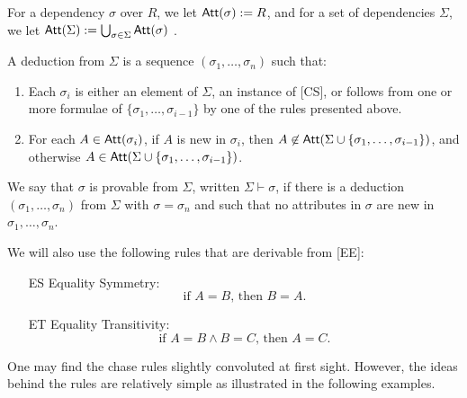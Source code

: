 \documentclass[envcountset]{llncs}
\newcommand{\problemFont}[1]{\protect\ensuremath{\mathsf{#1}}}
\newcommand{\si}{\sigma}
\newcommand{\Si}{\Sigma}
\newcommand{\ja}{\wedge}
\newcommand{\at}{\problemFont{Att}}
\begin{document}
For a dependency $\si$ over $R$, we let $\at(\si):=R$, and for a set of dependencies $\Si$, we let $\at(\Si):=\bigcup_{\si\in\Si}\at(\si)$ .

\begin{definition}\label{dedu}
A deduction from $\Si$ is a sequence $(\si_1, \ldots ,\si_n)$ such that:
\begin{enumerate}
\item Each $\si_i$ is either an element of $\Si$, an instance of [CS], or follows from one or more formulae of $\{\sigma_1, \ldots ,\sigma_{i-1}\}$ by one of the rules presented above.
\item For each $A\in \at(\si_i)$, if $A$ is new in $\si_i$, then $A\not\in \at(\Si\cup\{\sigma_1,\ldots ,\sigma_{i-1}\})$, and otherwise $A\in \at(\Si\cup\{\sigma_1,\ldots ,\sigma_{i-1}\})$.
\end{enumerate}
We say that $\si$ is provable from $\Si$, written $\Si \vdash \si$, if there is a deduction $(\si_1, \ldots ,\si_n)$ from $\Si$ with $\si=\si_n$ and such that no attributes in $\si$ are new in $\si_1, \ldots ,\si_n$. \end{definition}

 We will also use the following rules that are derivable from [EE]:\\
\begin{itemize}
\item[ES] Equality Symmetry: $$\textrm{if }A=B\textrm{, then } B=A.$$
\item[ET] Equality Transitivity: $$\textrm{if }A = B \ja B = C \textrm{, then }A = C.$$




\end{itemize}
One may find the chase rules  slightly convoluted at first sight. However, the ideas behind the rules are relatively simple as illustrated in the following examples. 
\end{document}
